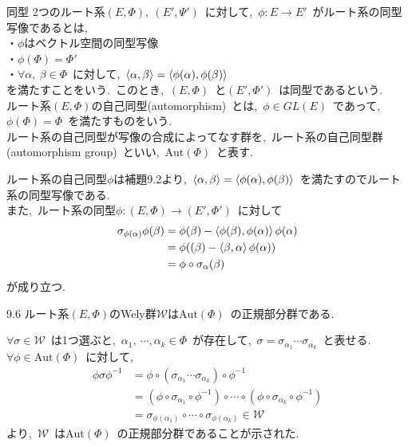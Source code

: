 \documentclass[uplatex,dvipdfmx]{jsarticle}
\begin{document}
\begin{mydef}{同型}
    2つのルート系$(E,\Phi),~(E',\Psi')$~に対して,~$\phi:E\to E'$~がルート系の同型写像であるとは,\\
    ・$\phi$はベクトル空間の同型写像\\
    ・$\phi(\Phi) = \Phi'$\\
    ・$\forall \alpha,~\beta \in \Phi$~に対して,~$\ev{\alpha, \beta} = \ev{\phi(\alpha), \phi(\beta)}$\\
    を満たすことをいう.~このとき,~$(E,\Phi)$~と$(E',\Phi')$~は同型であるという.\\
    ルート系$(E,\Phi)$の自己同型(automorphism)~とは,~$\phi \in GL(E)$~であって,~$\phi(\Phi) = \Phi$~を満たすものをいう.\\
    ルート系の自己同型が写像の合成によってなす群を,~ルート系の自己同型群(automorphism group)~といい,~$\text{Aut}(\Phi)$~と表す.
\end{mydef}
ルート系の自己同型$\phi$は補題9.2より,~$\ev{\alpha, \beta} = \ev{\phi(\alpha), \phi(\beta)}$~を満たすのでルート系の同型写像である.\\
また,~ルート系の同型$\phi:(E,\Phi) \to (E',\Phi')$~に対して
\begin{equation*}
    \begin{split}
        \sigma_{\phi(\alpha)} \phi(\beta) &= \phi(\beta) - \ev{\phi(\beta), \phi(\alpha)} \phi(\alpha)\\
        &=\phi((\beta) - \ev{\beta, \alpha} \phi(\alpha) )\\
        &= \phi \circ \sigma_\alpha (\beta)
    \end{split}
\end{equation*}
が成り立つ.
\begin{myexercise}{9.6}
    ルート系$(E,\Phi)$のWely群$\mathcal{W}$は$\text{Aut}(\Phi)$~の正規部分群である.
\end{myexercise}
\begin{myproof}
    $\forall \sigma \in \mathcal{W}$~は1つ選ぶと,~$\alpha_1,~\cdots, \alpha_k \in \Phi$~が存在して,~$\sigma = \sigma_{\alpha_1} \cdots \sigma_{\alpha_k}$~と表せる.~\\
    $\forall \phi \in \text{Aut}(\Phi)$~に対して,~
    \begin{equation*}
        \begin{split}
            \phi \sigma \phi^{-1} &= \phi\circ (\sigma_{\alpha_1} \cdots \sigma_{\alpha_k}) \circ \phi^{-1}\\
            &= (\phi  \circ \sigma_{\alpha_1} \circ \phi^{-1}) \circ \cdots \circ (\phi \circ \sigma_{\alpha_k} \circ \phi^{-1})\\
            &= \sigma_{\phi(\alpha_1)} \circ \cdots \circ \sigma_{\phi(\alpha_k)} \in \mathcal{W}
        \end{split}
    \end{equation*}
    より,~$\mathcal{W}$~は$\text{Aut}(\Phi)$~の正規部分群であることが示された.
\end{myproof}
\end{document}
